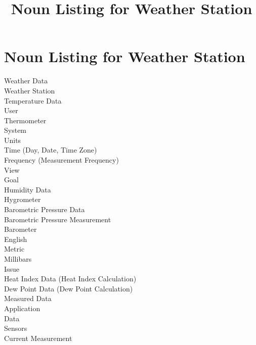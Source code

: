 \documentclass[letterpaper]{article}
\title{Noun Listing for Weather Station}
\begin{document}
\noindent
\section{Noun Listing for Weather Station}
Weather Data\\
Weather Station\\
Temperature Data\\
User\\
Thermometer\\
System\\
Units\\
Time (Day, Date, Time Zone)\\
Frequency (Measurement Frequency)\\
View\\
Goal\\
Humidity Data\\
Hygrometer\\
Barometric Pressure Data\\
Barometric Pressure Measurement\\
Barometer\\
English\\
Metric\\
Millibars\\
Issue\\
Heat Index Data (Heat Index Calculation)\\
Dew Point Data (Dew Point Calculation)\\
Measured Data\\
Application\\
Data\\
Sensors\\
Current Measurement\\
\end{document}
